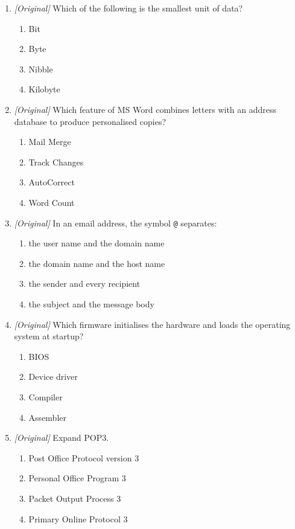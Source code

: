 \documentclass[11pt]{article}
\begin{document}
\begin{enumerate}[label=\textbf{Q\arabic*.}, leftmargin=*]
\begin{enumerate}[label=\Alph*.]
  \end{enumerate}
\item \textit{[Original]} Which of the following is the smallest unit of data?
  \begin{enumerate}[label=\Alph*.]
    \item Bit
    \item Byte
    \item Nibble
    \item Kilobyte
  \end{enumerate}
\item \textit{[Original]} Which feature of MS Word combines letters with an
  address database to produce personalised copies?
  \begin{enumerate}[label=\Alph*.]
    \item Mail Merge
    \item Track Changes
    \item AutoCorrect
    \item Word Count
  \end{enumerate}
\item \textit{[Original]} In an email address, the symbol \texttt{@} separates:
  \begin{enumerate}[label=\Alph*.]
    \item the user name and the domain name
    \item the domain name and the host name
    \item the sender and every recipient
    \item the subject and the message body
  \end{enumerate}
\item \textit{[Original]} Which firmware initialises the hardware and loads
  the operating system at startup?
  \begin{enumerate}[label=\Alph*.]
    \item BIOS
    \item Device driver
    \item Compiler
    \item Assembler
  \end{enumerate}
\item \textit{[Original]} Expand POP3.
  \begin{enumerate}[label=\Alph*.]
    \item Post Office Protocol version 3
    \item Personal Office Program 3
    \item Packet Output Process 3
    \item Primary Online Protocol 3

\end{enumerate}
\end{enumerate}
\end{document}
